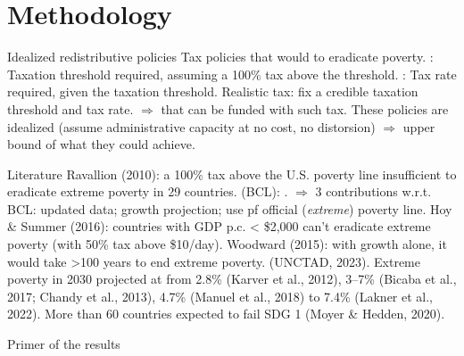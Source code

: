 \documentclass[aspectratio=169,xcolor=dvipsnames, 11pt,mathserif]{beamer}
\begin{document}
\section{Methodology}

\begin{frame}{Idealized redistributive policies} %
    \bbsp
    \ip Tax policies that would  to eradicate poverty.
    \ip \textbf{}: Taxation threshold required, assuming a 100\% tax above the threshold.
    \ip \textbf{}: Tax rate required, given the taxation threshold.
    \ip Realistic tax: fix a credible taxation threshold and tax rate.
    \ip $\Rightarrow$ \textbf{} that can be funded with such tax.
    \ip \warning These policies are idealized (assume administrative capacity at no cost, no distorsion) $\Rightarrow$ upper bound of what they could achieve.
    \ee
\end{frame}

\begin{frame}{Literature}
    \bbvsp
    \ip Ravallion (2010): a 100\% tax above the U.S. poverty line insufficient to eradicate extreme poverty in 29 countries.
    \ip {} (BCL): .
    \ip $\Rightarrow$ 3 contributions w.r.t. BCL: updated data; growth projection; use pf official (\textit{extreme}) poverty line.
    \ip Hoy \& Summer (2016): countries with GDP p.c. < \$2,000 can't eradicate extreme poverty (with 50\% tax above \$10/day).
    \ip Woodward (2015): with growth alone, it would take >100 years to end extreme poverty. 
    \ip {} (UNCTAD, 2023).
    \ip Extreme poverty in 2030 projected at from 2.8\% (Karver et al., 2012), 3--7\% (Bicaba et al., 2017; Chandy et al., 2013), 4.7\% (Manuel et al., 2018) to 7.4\% (Lakner et al., 2022).
    \ip More than 60 countries expected to fail SDG 1 (Moyer \& Hedden, 2020).
    \ee
\end{frame}

\begin{frame}{Primer of the results}
    \bbsp
    \ip 
    \ee
\end{frame}
\end{document}
